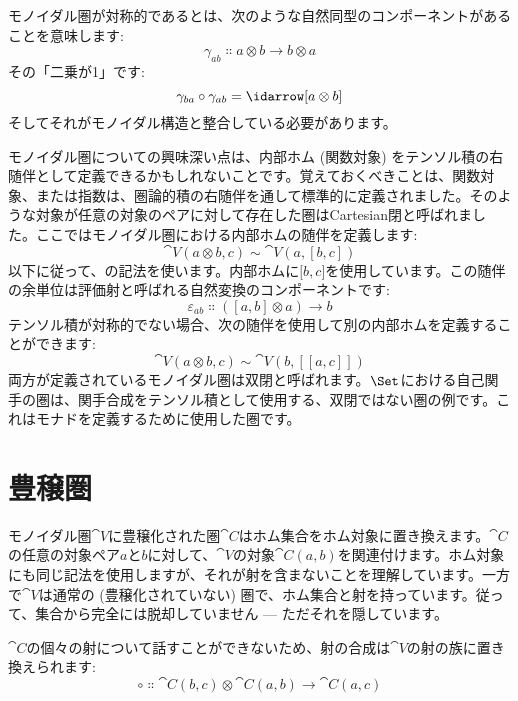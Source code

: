 \begin{figure}[H]
  \centering
\end{figure}

\noindent
モノイダル圏が対称的であるとは、次のような自然同型のコンポーネントがあることを意味します: 
\[\gamma_{a b} \Colon a \otimes b \to b \otimes a\]
その「二乗が1」です: 
\[\gamma_{b a} \circ \gamma_{a b} = \idarrow[a \otimes b]\]
そしてそれがモノイダル構造と整合している必要があります。

モノイダル圏についての興味深い点は、内部ホム (関数対象) をテンソル積の右随伴として定義できるかもしれないことです。覚えておくべきことは、関数対象、または指数は、圏論的積の右随伴を通して標準的に定義されました。そのような対象が任意の対象のペアに対して存在した圏はCartesian閉と呼ばれました。ここではモノイダル圏における内部ホムの随伴を定義します: 
\[\cat{V}(a \otimes b, c) \sim \cat{V}(a, [b, c])\]
以下に従って、の記法を使います。内部ホムに${[}b, c{]}$を使用しています。この随伴の余単位は評価射と呼ばれる自然変換のコンポーネントです: 
\[\varepsilon_{a b} \Colon ([a, b] \otimes a) \to b\]
テンソル積が対称的でない場合、次の随伴を使用して別の内部ホムを定義することができます: 
\[\cat{V}(a \otimes b, c) \sim \cat{V}(b, [[a, c]])\]
両方が定義されているモノイダル圏は双閉と呼ばれます。$\Set$における自己関手の圏は、関手合成をテンソル積として使用する、双閉ではない圏の例です。これはモナドを定義するために使用した圏です。

\section{豊穣圏}

モノイダル圏$\cat{V}$に豊穣化された圏$\cat{C}$はホム集合をホム対象に置き換えます。$\cat{C}$の任意の対象ペア$a$と$b$に対して、$\cat{V}$の対象$\cat{C}(a, b)$を関連付けます。ホム対象にも同じ記法を使用しますが、それが射を含まないことを理解しています。一方で$\cat{V}$は通常の (豊穣化されていない) 圏で、ホム集合と射を持っています。従って、集合から完全には脱却していません --- ただそれを隠しています。

$\cat{C}$の個々の射について話すことができないため、射の合成は$\cat{V}$の射の族に置き換えられます: 
\[\circ \Colon \cat{C}(b, c) \otimes \cat{C}(a, b) \to \cat{C}(a, c)\]

